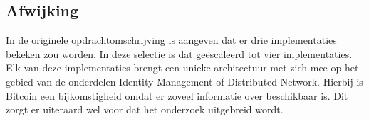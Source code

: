 \subsection{Afwijking}
In de originele opdrachtomschrijving is aangeven dat er drie implementaties bekeken zou worden. In deze selectie is dat geëscaleerd tot vier implementaties. Elk van deze implementaties brengt een unieke architectuur met zich mee op het gebied van de onderdelen Identity Management of Distributed Network. Hierbij is Bitcoin een bijkomstigheid omdat er zoveel informatie over beschikbaar is. Dit zorgt er uiteraard wel voor dat het onderzoek uitgebreid wordt.